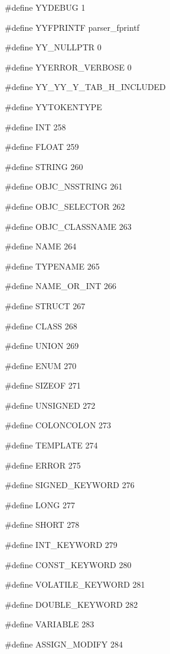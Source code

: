 \medskip
{\stt \#define YYDEBUG 1}

\medskip
{\stt \#define YYFPRINTF parser\_fprintf}

\medskip
{\stt \#define YY\_NULLPTR 0}

\medskip
{\stt \#define YYERROR\_VERBOSE 0}

\medskip
{\stt \#define YY\_YY\_Y\_TAB\_H\_INCLUDED}

\medskip
{\stt \#define YYTOKENTYPE}

\medskip
{\stt \#define INT 258}

\medskip
{\stt \#define FLOAT 259}

\medskip
{\stt \#define STRING 260}

\medskip
{\stt \#define OBJC\_NSSTRING 261}

\medskip
{\stt \#define OBJC\_SELECTOR 262}

\medskip
{\stt \#define OBJC\_CLASSNAME 263}

\medskip
{\stt \#define NAME 264}

\medskip
{\stt \#define TYPENAME 265}

\medskip
{\stt \#define NAME\_OR\_INT 266}

\medskip
{\stt \#define STRUCT 267}

\medskip
{\stt \#define CLASS 268}

\medskip
{\stt \#define UNION 269}

\medskip
{\stt \#define ENUM 270}

\medskip
{\stt \#define SIZEOF 271}

\medskip
{\stt \#define UNSIGNED 272}

\medskip
{\stt \#define COLONCOLON 273}

\medskip
{\stt \#define TEMPLATE 274}

\medskip
{\stt \#define ERROR 275}

\medskip
{\stt \#define SIGNED\_KEYWORD 276}

\medskip
{\stt \#define LONG 277}

\medskip
{\stt \#define SHORT 278}

\medskip
{\stt \#define INT\_KEYWORD 279}

\medskip
{\stt \#define CONST\_KEYWORD 280}

\medskip
{\stt \#define VOLATILE\_KEYWORD 281}

\medskip
{\stt \#define DOUBLE\_KEYWORD 282}

\medskip
{\stt \#define VARIABLE 283}

\medskip
{\stt \#define ASSIGN\_MODIFY 284}

